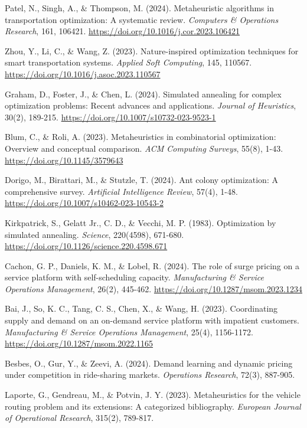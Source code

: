 \documentclass[conference]{IEEEtran}
\begin{document}
\begin{thebibliography}{26}
 Patel, N., Singh, A., \& Thompson, M. (2024). Metaheuristic algorithms in transportation optimization: A systematic review. \textit{Computers \& Operations Research}, 161, 106421. \url{https://doi.org/10.1016/j.cor.2023.106421}

 Zhou, Y., Li, C., \& Wang, Z. (2023). Nature-inspired optimization techniques for smart transportation systems. \textit{Applied Soft Computing}, 145, 110567. \url{https://doi.org/10.1016/j.asoc.2023.110567}

 Graham, D., Foster, J., \& Chen, L. (2024). Simulated annealing for complex optimization problems: Recent advances and applications. \textit{Journal of Heuristics}, 30(2), 189-215. \url{https://doi.org/10.1007/s10732-023-9523-1}

 Blum, C., \& Roli, A. (2023). Metaheuristics in combinatorial optimization: Overview and conceptual comparison. \textit{ACM Computing Surveys}, 55(8), 1-43. \url{https://doi.org/10.1145/3579643}

 Dorigo, M., Birattari, M., \& Stutzle, T. (2024). Ant colony optimization: A comprehensive survey. \textit{Artificial Intelligence Review}, 57(4), 1-48. \url{https://doi.org/10.1007/s10462-023-10543-2}

 Kirkpatrick, S., Gelatt Jr., C. D., \& Vecchi, M. P. (1983). Optimization by simulated annealing. \textit{Science}, 220(4598), 671-680. \url{https://doi.org/10.1126/science.220.4598.671}

 Cachon, G. P., Daniels, K. M., \& Lobel, R. (2024). The role of surge pricing on a service platform with self-scheduling capacity. \textit{Manufacturing \& Service Operations Management}, 26(2), 445-462. \url{https://doi.org/10.1287/msom.2023.1234}

 Bai, J., So, K. C., Tang, C. S., Chen, X., \& Wang, H. (2023). Coordinating supply and demand on an on-demand service platform with impatient customers. \textit{Manufacturing \& Service Operations Management}, 25(4), 1156-1172. \url{https://doi.org/10.1287/msom.2022.1165}

 Besbes, O., Gur, Y., \& Zeevi, A. (2024). Demand learning and dynamic pricing under competition in ride-sharing markets. \textit{Operations Research}, 72(3), 887-905.

 Laporte, G., Gendreau, M., \& Potvin, J. Y. (2023). Metaheuristics for the vehicle routing problem and its extensions: A categorized bibliography. \textit{European Journal of Operational Research}, 315(2), 789-817.


\end{thebibliography}
\end{document}
